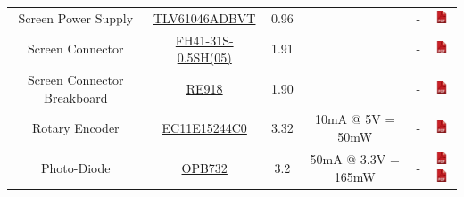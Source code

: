 \documentclass[12pt,a4paper,landscape]{article}
\begin{document}
{\begin{tabular}{|c|c|c|c|c|c|}
					Screen Power Supply &
					\href{http://fr.farnell.com/texas-instruments/tlv61046adbvt/convert-dc-dc-boost-1mhz-sot-23/dp/2766885?ost=TLV61046ADBVT}
					{TLV61046ADBVT} & 0.96 & &
					- &
					\href{http://www.ti.com/lit/ds/slvsd82a/slvsd82a.pdf}{\includegraphics[height=1em]{pdf.png}}\\
					
					Screen Connector &
					\href{http://fr.farnell.com/hirose-hrs/fh41-31s-0-5sh-05/conn-ffc-embase-31voies-1rangee/dp/2427829}
					{FH41-31S-0.5SH(05)} & 1.91 & &
					- &
					\href{http://www.farnell.com/datasheets/2169332.pdf}{\includegraphics[height=1em]{pdf.png}}\\
					
					Screen Connector Breakboard &
					\href{http://uk.farnell.com/roth-elektronik/re918/fpc-ffc-adaptor-fibreglass-1-5mm/dp/2474691?st=adaptor}
					{RE918} & 1.90 & &
					- &
					\href{http://www.farnell.com/datasheets/2169332.pdf}{\includegraphics[height=1em]{pdf.png}}\\
					
					Rotary Encoder &
					\href{http://fr.farnell.com/alps/ec11e15244c0/encodeur-vert-30-crans-15-impul/dp/1520806?st=boutton}
					{EC11E15244C0} & 3.32 & 10mA @ 5V = 50mW & 
					- &
					\href{http://www.farnell.com/datasheets/5205.pdf}{\includegraphics[height=1em]{pdf.png}}\\
					
					Photo-Diode &
					\href{http://fr.farnell.com/optek-technology/opb732/capteur-reflectif-pcb/dp/1226877}
					{OPB732} & 3.2 & 50mA @ 3.3V = 165mW &
					- &
					\href{http://www.farnell.com/datasheets/2331536.pdf}{\includegraphics[height=1em]{pdf.png}}
					\href{http://www.mouser.com/ds/2/414/OP265-266-45966.pdf}{\includegraphics[height=1em]{pdf.png}}\\
					    

\end{tabular}}
\end{document}
